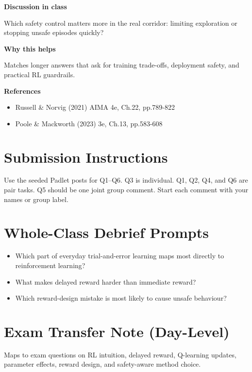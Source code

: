 \documentclass[11pt]{article}
\providecommand{\tightlist}{\setlength{\itemsep}{0pt}\setlength{\parskip}{0pt}}
\begin{document}
\begin{tcolorbox}[colback=white,colframe=MidnightBlue,title={Q6 Exam-Style Constructed Response},fonttitle=\bfseries,breakable]
{\large\bfseries\color{MidnightBlue} Discussion in class}\par\medskip
Which safety control matters more in the real corridor: limiting exploration or stopping unsafe episodes quickly?

{\large\bfseries\color{MidnightBlue} Why this helps}\par\medskip
Matches longer answers that ask for training trade-offs, deployment safety, and practical RL guardrails.

{\large\bfseries\color{MidnightBlue} References}\par\medskip
\begin{itemize}\item Russell \& Norvig (2021) AIMA 4e, Ch.22, pp.789-822
\item Poole \& Mackworth (2023) 3e, Ch.13, pp.583-608\end{itemize}
\end{tcolorbox}

\section*{Submission Instructions}

Use the seeded Padlet posts for Q1--Q6. Q3 is individual. Q1, Q2, Q4, and Q6 are pair tasks. Q5 should be one joint group comment. Start each comment with your names or group label.

\section*{Whole-Class Debrief Prompts}

\begin{itemize}
\tightlist
\item
  Which part of everyday trial-and-error learning maps most directly to reinforcement learning?
\item
  What makes delayed reward harder than immediate reward?
\item
  Which reward-design mistake is most likely to cause unsafe behaviour?
\end{itemize}

\section*{Exam Transfer Note (Day-Level)}

Maps to exam questions on RL intuition, delayed reward, Q-learning updates, parameter effects, reward design, and safety-aware method choice.
\end{document}
